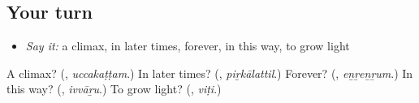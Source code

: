 \subsection*{Your turn}
\begin{itemize}
\raggedright
  \item \emph{Say it:} a climax, in later times, forever, in this way, to grow light
\end{itemize}

\begin{tcolorbox}[breakable,colback=teal!4,colframe=teal!35!black,title={Before you move on}]
A climax? (\textbf{}, \emph{uccakaṭṭam}.) In later times? (\textbf{}, \emph{piṟkālattil}.) Forever? (\textbf{}, \emph{eṉṟeṉṟum}.) In this way? (\textbf{}, \emph{ivvāṟu}.) To grow light? (\textbf{}, \emph{viṭi}.)
\end{tcolorbox}
